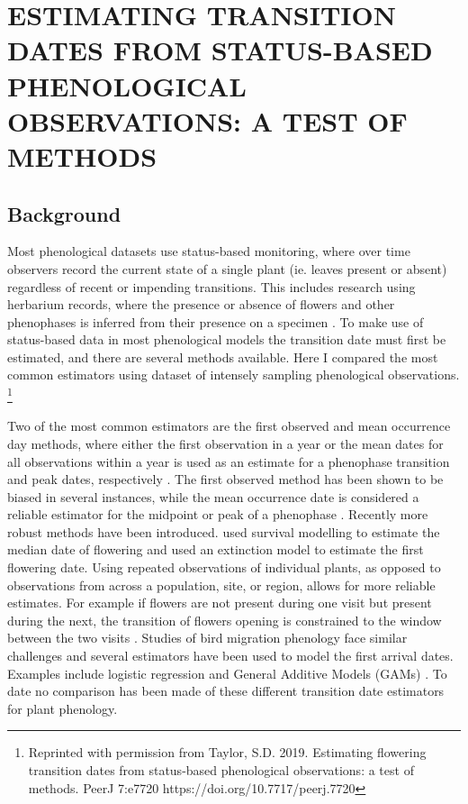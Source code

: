 \chapter{ESTIMATING TRANSITION DATES FROM STATUS-BASED PHENOLOGICAL OBSERVATIONS: A TEST OF METHODS}

\section{Background}
Most phenological datasets use status-based monitoring, where over time observers record the current state of a single plant (ie. leaves present or absent) regardless of recent or impending transitions. This includes research using herbarium records, where the presence or absence of flowers and other phenophases is inferred from their presence on a specimen \citep{willis2017}. To make use of status-based data in most phenological models the transition date must first be estimated, and there are several methods available. Here I compared the most common estimators using dataset of intensely sampling phenological observations. \renewcommand*{\thefootnote}{}\footnote{Reprinted with permission from Taylor, S.D. 2019. Estimating flowering transition dates from status-based phenological observations: a test of methods. PeerJ 7:e7720 https://doi.org/10.7717/peerj.7720}

Two of the most common estimators are the first observed and mean occurrence day methods, where either the first observation in a year or the mean dates for all observations within a year is used as an estimate for a phenophase transition and peak dates, respectively \citep{willis2017}. The first observed method has been shown to be biased in several instances, while the mean occurrence date is considered a reliable estimator for the midpoint or peak of a phenophase \citep{miller-rushing2008, moussus2010, bertin2015}. Recently more robust methods have been introduced. \cite{templ2017} used survival modelling to estimate the median date of flowering and \cite{pearse2017} used an extinction model to estimate the first flowering date. Using repeated observations of individual plants, as opposed to observations from across a population, site, or region, allows for more reliable estimates. For example if flowers are not present during one visit but present during the next, the transition of flowers opening is constrained to the window between the two visits \citep{gerst2016}. Studies of bird migration phenology face similar challenges and several estimators have been used to model the first arrival dates. Examples include logistic regression \citep{mayor2017} and General Additive Models (GAMs) \citep{moussus2009, newson2016, linden2017}. To date no comparison has been made of these different transition date estimators for plant phenology. 

